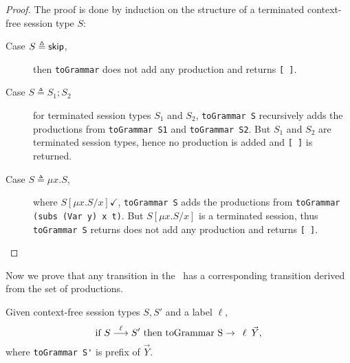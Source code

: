 \begin{proof}
	The proof is done by induction on the structure of a terminated
	context-free session type $S$:
	\begin{description}
		\item[Case $S\triangleq \mathsf{skip}$,] then \lstinline{toGrammar} does not 
		add any production and returns \lstinline{[ ]}.
		\item[Case $S\triangleq S_1;S_2$] for terminated session types $S_1$ and
		$S_2$, \lstinline{toGrammar S} recursively adds the productions from 
		\lstinline{toGrammar S1} and \lstinline{toGrammar S2}. But $S_1$ and 
		$S_2$ are terminated session types, hence no production is added and
		\lstinline{[ ]} is returned.
		\item[Case $S\triangleq \mu x. S$,] where $S[\mu x.S/x] \checkmark$,
		\lstinline{toGrammar S} adds the productions from \linebreak
		\lstinline{toGrammar (subs (Var y) x t)}. But $S[\mu x.S/x]$ is a terminated
		session, thus \lstinline{toGrammar S} returns does not add 
		any production and returns \lstinline{[ ]}.
	\end{description}
\end{proof}

Now we prove that any transition in the \LTS\ has a 
corresponding transition derived from the set of productions.

\begin{lemma}
Given context-free session types $S,S'$ and a label $\ell$,
	\[ \text{if } S \LTSderives[\ell] S' \text{ then } 
	\text{\lstinline{toGrammar S}} \rightarrow \enspace 
	\ell \enspace \vec Y, \]
	where \lstinline{toGrammar S'} is prefix of $\vec Y$.
\end{lemma}

